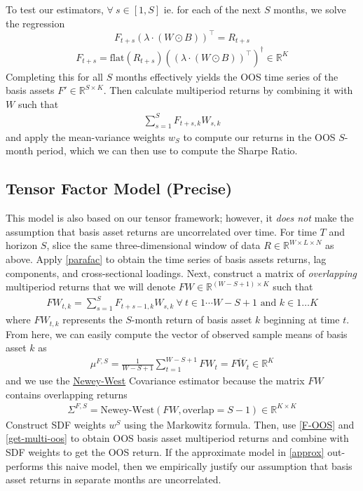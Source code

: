 \documentclass{article}
\newcommand{\R}{{\mathbb R}}
\begin{document}
To test our estimators, $\forall \ s \in [1, S]$ ie. for each of the next $S$ months, we solve the regression
\[F_{t+s} \left( \lambda \cdot (W \odot B)\right)^\top = R_{t+s}\]
\begin{align}
    F_{t+s} = \text{flat}(R_{t+s}) ((\lambda \cdot (W \odot B))^\top)^\dagger \in \mathbb{R}^{K} \label{F-OOS}
\end{align}
Completing this for all $S$ months effectively yields the OOS time series of the basis assets $F' \in \mathbb{R}^{S \times K}$. Then calculate multiperiod returns 
by combining it with $W$ such that 
\begin{align}
    \sum_{s=1}^S F_{t+s, k} W_{s, k} \label{get-multi-oos}
\end{align}
and apply the mean-variance weights $w_S$ to compute our returns in the OOS $S$-month period, 
which we can then use to compute the Sharpe Ratio. 

\subsection{Tensor Factor Model (Precise)} \label{precise}

This model is also based on our tensor framework; however, it \emph{does not} make the assumption that basis asset returns are uncorrelated
over time. For time $T$ and horizon $S$, slice the same three-dimensional window of data $R \in \R^{W \times L \times N}$ as above. Apply \ref{parafac} to obtain 
the time series of basis assets returns, lag components, and cross-sectional loadings. Next, construct a 
matrix of \emph{overlapping} multiperiod returns that we will denote $FW \in \R^{(W-S+1) \times K}$ such that 
\begin{align}
    FW_{t, k} = \sum_{s=1}^S F_{t+s-1, k}W_{s, k} \ \forall \ t \in 1 \cdots W - S+1 \text{ and } k \in 1 \ldots K \label{orig-FW-naive}
\end{align}
where $FW_{t, k}$ represents the $S$-month return of basis asset $k$ beginning at time $t$. 
From here, we can easily compute the vector of observed sample means of basis asset $k$ as 
\begin{align}
    \mu^{F, S} = \frac{1}{W-S+1} \sum_{t=1}^{W-S+1} FW_{t} = \overline{FW_t} \in \R^K
\end{align}
and we use the \href{https://www.hbs.edu/research-computing-services/Shared%20Documents/Training/hac.pdf}{Newey-West} Covariance estimator because the matrix $FW$ contains overlapping returns
\begin{align}
    \Sigma^{F, S} = \text{Newey-West}(FW, \text{overlap}=S-1) \in \R^{K \times K}
\end{align}
Construct SDF weights $w^S$ using the Markowitz formula. Then, use \ref{F-OOS} and \ref{get-multi-oos} to obtain OOS basis asset multiperiod returns
and combine with SDF weights to get the OOS return. If the approximate model in \ref{approx} out-performs this naive model, then 
we empirically justify our assumption that basis asset returns in separate months are uncorrelated.
\end{document}
